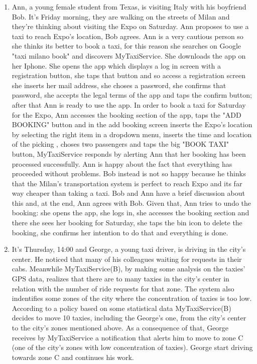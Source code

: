 \documentclass[11pt]{article} %
\begin{document}
\begin{enumerate}
          \item Ann, a young female student from Texas, is visiting Italy with his boyfriend Bob.
          It's Friday morning, they are walking on the streets of Milan and they're thinking
          about visiting the Expo on Saturday. Ann proposes to use a taxi to reach Expo's location,
          Bob agrees. Ann is a very cautious person so she thinks its better to book a taxi, for this
          reason she searches on Google "taxi milano book" and discovers MyTaxiService.
          She downloads the app on her Iphone. She opens the app which displays a log in screen with
          a registration button, she taps that button and so access a registration screen she inserts
          her mail address, she choses a password, she confirms that password, she accepts the legal
          terms of the app and taps the confirm button; after that Ann is ready to use the app.
          In order to book a taxi for Saturday for the Expo, Ann accesses the booking section of the app,
          taps the "ADD BOOKING" button and in the add booking screen inserts the Expo's location by selecting the right item in a dropdown menu, inserts the time and location of the picking
          , choses two passengers and taps the big "BOOK TAXI" button, MyTaxiService responds by alerting Ann that her booking
          has been processed successfully. Ann is happy about the fact that everything has proceeded without problems.
          Bob instead is not so happy because he thinks that the Milan's transportation system is perfect
          to reach Expo and its far way cheaper than taking a taxi. Bob and Ann have a brief discussion
          about this and, at the end, Ann agrees with Bob. Given that, Ann tries to undo the booking:
          she opens the app, she logs in, she accesses the booking section and there she sees her booking for Saturday, she taps
          the bin icon to delete the booking, she confirms her intention to do that and everything is done.

         \item It's Thursday, 14:00 and George, a young taxi driver, is driving in the city's center.
           He noticed that many of his colleagues waiting for requests in their cabs.
           Meanwhile MyTaxiService(B), by making some analysis on the taxies' GPS data, realizes that there are to many taxies
           in the city's center in relation with the number of ride requests for that zone. The system also indentifies
           some zones of the city where the concentration of taxies is too low. According to a policy based on some statistical data
           MyTaxiService(B) decides to move 10 taxies, including the George's one, from the city's center to the city's zones mentioned above.
          As a consequence of that, George receives by MyTaxiService a notification that alerts him to move to zone C (one of the city's zones
          with low concentration of taxies). George start driving towards zone C and continues his work.
        \end{enumerate}
        
\end{document}
